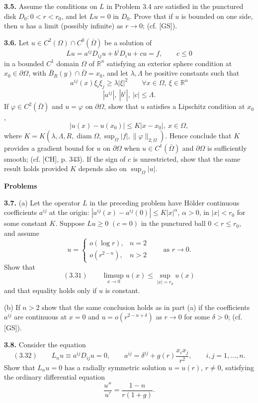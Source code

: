 \textbf{3.5.} Assume the conditions on $L$ in Problem 3.4 are satisfied in the punctured disk $D_0:0<r<r_0$, and let $Lu=0$ in $D_0$. Prove that if $u$ is bounded on one side, then $u$ has a limit (possibly infinite) as $r\to 0$; (cf. [GS]).

\textbf{3.6.} Let $u\in C^2(\Omega)\cap C^0(\bar\Omega)$ be a solution of
\[
Lu=a^{ij}D_{ij}u+b^iD_iu+cu=f,\qquad c\leq 0
\]
in a bounded $C^1$ domain $\Omega$ of $\mathbb{R}^n$ satisfying an exterior sphere condition at $x_0\in\partial\Omega$, with $\bar B_R(y)\cap\bar\Omega=x_0$, and let $\lambda,\Lambda$ be positive constants such that
\[
a^{ij}(x)\xi_i\xi_j\geq \lambda|\xi|^2\qquad \forall x\in\Omega,\ \xi\in\mathbb{R}^n
\]
\[
|a^{ij}|,\ |b^i|,\ |c|\leq \Lambda.
\]
If $\varphi\in C^2(\bar\Omega)$ and $u=\varphi$ on $\partial\Omega$, show that $u$ satisfies a Lipschitz condition at $x_0$,
\[
|u(x)-u(x_0)|\leq K|x-x_0|,\ x\in\Omega,
\]
where $K=K(\lambda,\Lambda,R,\operatorname{diam}\Omega,\sup_\Omega|f|,\|\varphi\|_{2;\Omega})$. Hence conclude that $K$ provides a gradient bound for $u$ on $\partial\Omega$ when $u\in C^1(\bar\Omega)$ and $\partial\Omega$ is sufficiently smooth; (cf. [CH], p. 343). If the sign of $c$ is unrestricted, show that the same result holds provided $K$ depends also on $\sup_{\Omega}|u|$.


\textbf{Problems}

\textbf{3.7.} \quad (a) Let the operator $L$ in the preceding problem have H\"older continuous coefficients $a^{ij}$ at the origin: $|a^{ij}(x)-a^{ij}(0)|\leq K|x|^{\alpha}$, $\alpha>0$, in $|x|<r_0$ for some constant $K$. Suppose $Lu\geq 0$ $(c=0)$ in the punctured ball $0<r\leq r_0$, and assume
\[
u=
\begin{cases}
o(\log r), & n=2 \\
o(r^{2-n}), & n>2
\end{cases}
\qquad \text{as } r\to 0.
\]
Show that
\[
(3.31)\qquad \limsup_{x\to 0} u(x)\leq \sup_{|x|=r_0} u(x)
\]
and that equality holds only if $u$ is constant.

\quad (b) If $n>2$ show that the same conclusion holds as in part (a) if the coefficients $a^{ij}$ are continuous at $x=0$ and $u=o(r^{2-n+\delta})$ as $r\to 0$ for some $\delta>0$; (cf. [GS]).

\textbf{3.8.} Consider the equation
\[
(3.32)\qquad L_nu\equiv a^{ij}D_{ij}u=0,\qquad a^{ij}=\delta^{ij}+g(r)\frac{x_ix_j}{r^2},\qquad i,j=1,\ldots,n.
\]
Show that $L_nu=0$ has a radially symmetric solution $u=u(r)$, $r\neq 0$, satisfying the ordinary differential equation
\[
\frac{u''}{u'}=\frac{1-n}{r(1+g)}.
\]

